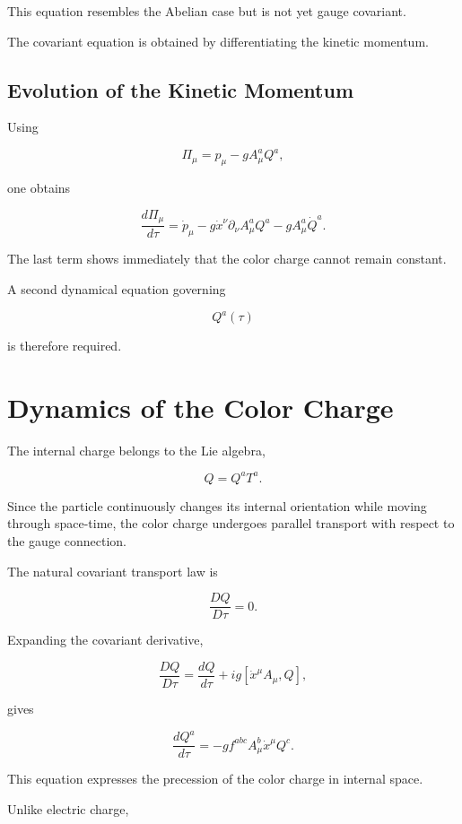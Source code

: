 This equation resembles the Abelian case but is not yet gauge covariant.

The covariant equation is obtained by differentiating the kinetic
momentum.


\subsection{Evolution of the Kinetic Momentum}

Using

\[
\Pi_\mu
=
p_\mu
-
gA_\mu^aQ^a,
\]

one obtains

\[
\frac{d\Pi_\mu}{d\tau}
=
\dot p_\mu
-
g
\dot x^\nu
\partial_\nu A_\mu^aQ^a
-
gA_\mu^a
\dot Q^a.
\]

The last term shows immediately that the color charge cannot remain
constant.

A second dynamical equation governing

\[
Q^a(\tau)
\]

is therefore required.


\section{Dynamics of the Color Charge}

The internal charge belongs to the Lie algebra,

\[
Q
=
Q^aT^a.
\]

Since the particle continuously changes its internal orientation while
moving through space-time, the color charge undergoes parallel transport
with respect to the gauge connection.

The natural covariant transport law is

\[
\boxed{
\frac{DQ}{D\tau}
=
0.
}
\]

Expanding the covariant derivative,

\[
\frac{DQ}{D\tau}
=
\frac{dQ}{d\tau}
+
ig
[\dot x^\mu A_\mu,Q],
\]

gives

\[
\boxed{
\frac{dQ^a}{d\tau}
=
-g
f^{abc}
A_\mu^b
\dot x^\mu
Q^c.
}
\]

This equation expresses the precession of the color charge in internal
space.

Unlike electric charge,


